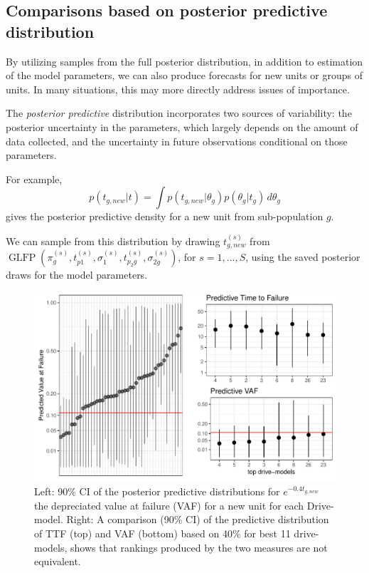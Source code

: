 \documentclass[12pt]{article}
\begin{document}
 
 



\subsection{Comparisons based on posterior predictive distribution}
By utilizing samples from the full posterior distribution, in addition to estimation of the model parameters, we can also produce forecasts for new units or groups of units. In many situations, this may more directly address issues of importance.

The {\em posterior predictive} distribution incorporates two sources of variability: the posterior uncertainty in the parameters, which largely depends on the
amount of data collected, and the uncertainty in future
observations conditional on those parameters. 

For example,
\begin{equation*}
  p(t_{g,new}|t) = \int p(t_{g,new}|\theta_g) p(\theta_g|t_g) \, d\theta_g
\end{equation*}
gives the posterior predictive density for a new unit from sub-population $g$.

We can sample from this distribution by drawing $t_{g,new}^{(s)}$ from
$\operatorname{GLFP}(\pi_g^{(s)},
t_{p1}^{(s)},\sigma_1^{(s)},t_{p_{2}g}^{(s)},\sigma_{2g}^{(s)})$, for
$s=1,...,S$, using the saved posterior draws for the model
parameters. 

\begin{figure}[H]
  \centering
  \includegraphics[width=.8\textwidth]{dm-eval}
  \caption{Left: 90\% CI of the posterior predictive distributions for $e^{-0.4 t_{g,new}}$ the depreciated value at failure (VAF) for a new unit for each Drive-model.
  Right: A comparison (90\% CI) of the predictive distribution of TTF (top) and VAF (bottom) based on 40\% for best 11 drive-models, shows that rankings produced by the two measures are not equivalent.}
  \label{fig5}
\end{figure}
\end{document}
